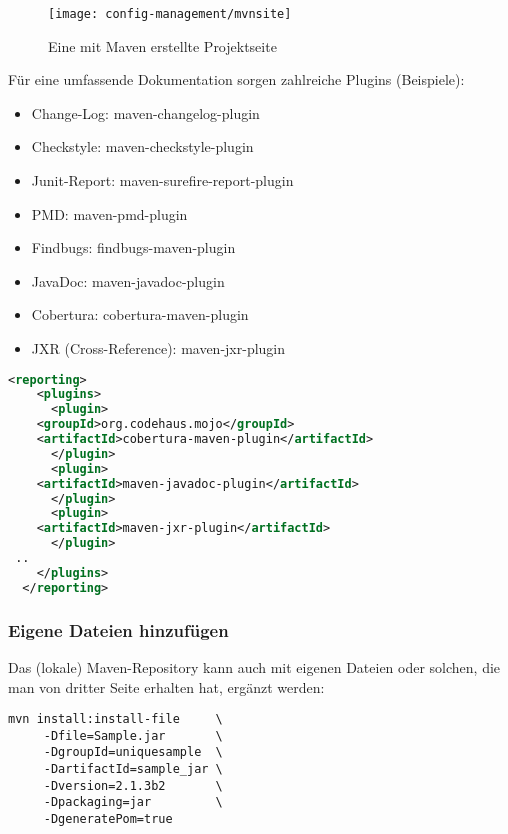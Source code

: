 \newslide
\begin{figure}[H]
\centering
\texttt{[image: config-management/mvnsite]}
\caption{Eine mit Maven erstellte Projektseite}
\end{figure}
\newslide
Für eine umfassende Dokumentation sorgen zahlreiche Plugins (Beispiele):
\begin{itemize}
\item Change-Log: maven-changelog-plugin
\item Checkstyle: maven-checkstyle-plugin
\item Junit-Report: maven-surefire-report-plugin
\item PMD: maven-pmd-plugin
\item Findbugs: findbugs-maven-plugin
\item JavaDoc: maven-javadoc-plugin
\item Cobertura: cobertura-maven-plugin
\item JXR (Cross-Reference): maven-jxr-plugin
\end{itemize}
\newslide
\begin{lstlisting}[language=xml,
  morekeywords={reporting,plugins,plugin,groupId,artifactId,
    version,configuration}]
  <reporting>
    <plugins>
      <plugin>
	<groupId>org.codehaus.mojo</groupId>
	<artifactId>cobertura-maven-plugin</artifactId>
      </plugin>
      <plugin>
	<artifactId>maven-javadoc-plugin</artifactId>
      </plugin>
      <plugin>
	<artifactId>maven-jxr-plugin</artifactId>
      </plugin>
 ..
    </plugins>
  </reporting>
\end{lstlisting}
\newslide
\newslide
\subsubsection{Eigene Dateien hinzufügen}
Das (lokale) Maven-Repository kann auch mit eigenen Dateien oder solchen,
die man von dritter Seite erhalten hat, ergänzt werden:
\begin{lstlisting}
mvn install:install-file     \
     -Dfile=Sample.jar       \
     -DgroupId=uniquesample  \
     -DartifactId=sample_jar \
     -Dversion=2.1.3b2       \
     -Dpackaging=jar         \
     -DgeneratePom=true
\end{lstlisting}
%
\newslide
